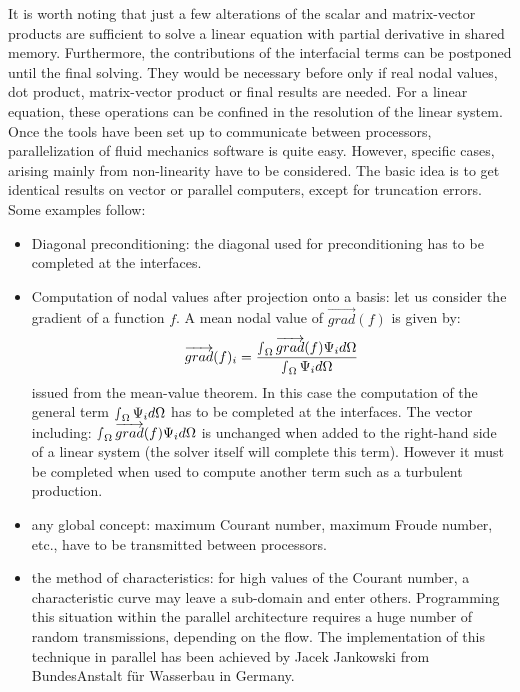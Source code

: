 It is worth noting that just a few alterations of the scalar and matrix-vector
products are sufficient to solve a linear equation with partial derivative in
shared memory. Furthermore, the contributions of the interfacial terms can be
postponed until the final solving. They would be necessary before only if real
nodal values, dot product, matrix-vector product or final results are needed.
For a linear equation, these operations can be confined in the resolution of
the linear system. Once the tools have been set up to communicate between
processors, parallelization of fluid mechanics software is quite easy. However,
specific cases, arising mainly from non-linearity have to be considered. The
basic idea is to get identical results on vector or parallel computers, except
for truncation errors. Some examples follow:
\begin{itemize}
  \item Diagonal preconditioning: the diagonal used for preconditioning has to
    be completed at the interfaces.
  \item Computation of nodal values after projection onto a basis: let us
    consider the gradient of a function $f$. A mean nodal value of
    $\overrightarrow{grad} (f)$  is given by:
    \[\overrightarrow{grad} (f)_{i} =
      \frac{\mathop{\smallint}\nolimits_{\Omega } \overrightarrow{grad} (f)\Psi _{i}
d\Omega }{\mathop{\smallint }\nolimits_{\Omega } \Psi _{i}  d\Omega } \]
issued from the mean-value theorem. In this case the computation of the general
term  $\mathop{\smallint }\nolimits_{\Omega } \Psi _{i}  d\Omega $  has to be
completed at the interfaces. The vector including: $\mathop{\smallint
}\nolimits_{\Omega } \overrightarrow{grad} (f)\Psi _{i}
d\Omega $ is unchanged when added to the right-hand side of a linear system
(the solver itself will complete this term). However it must be completed when
used to compute another term such as a turbulent production.
  \item any global concept: maximum Courant number, maximum Froude number,
    etc., have to be transmitted between processors.

  \item the method of characteristics: for high values of the Courant number, a
    characteristic curve may leave a sub-domain and enter others. Programming
    this situation within the parallel architecture requires a huge number of
    random transmissions, depending on the flow. The implementation of this
    technique in parallel has been achieved by Jacek Jankowski from
    BundesAnstalt f\"{u}r Wasserbau in Germany.
\end{itemize}

